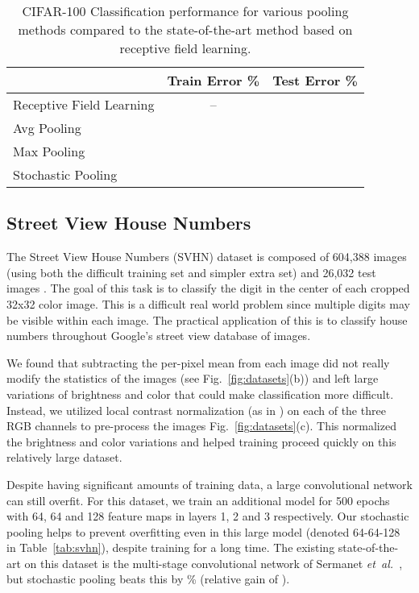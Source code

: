 \documentclass{article} \usepackage{nips12submit_e,times}
\newcommand{\fig}[1]{Fig.~\ref{fig:#1}}
\newcommand{\tab}[1]{Table~\ref{tab:#1}}
\def\etal{{\textit{et~al.~}}}
\begin{document}
\begin{table}[h!]
\small
\vspace*{-2mm}
\begin{center}
\begin{tabular}{|l|c|c|}
  \hline
  & Train Error \% & Test Error \% \\
  \hline Receptive Field Learning \cite{Jia11} & -- &  \\
  \hline  \hline   Avg Pooling &  &  \\
   \hline Max Pooling &  &  \\
   \hline Stochastic Pooling &  &  \\
   \hline
\end{tabular}
\vspace*{-1mm}
\caption{CIFAR-100 Classification performance for various pooling
  methods compared to the state-of-the-art method based on receptive
  field learning.}
\label{tab:cifar100}
\end{center}
\vspace*{-6mm}
\end{table}


\subsection{Street View House Numbers} \label{sec:SVHN}

The Street View House Numbers (SVHN) dataset is composed of 604,388
images (using both the difficult training set and simpler extra set)
and 26,032 test images \cite{SVHN}. The goal of this task is to classify the digit
in the center of each cropped 32x32 color image. This is a difficult real
world problem since multiple digits may be visible within each
image. The practical application of this is to classify house numbers
throughout Google's street view database of images.

We found that subtracting the per-pixel mean from each image did not
really modify the statistics of the images (see \fig{datasets}(b)) and
left large variations of brightness and color that could make
classification more difficult. Instead, we utilized local contrast
normalization  (as in \cite{Sermanet11}) on each of the three RGB channels to pre-process the
images \fig{datasets}(c). This normalized the brightness and color
variations and helped training proceed quickly on this relatively
large dataset.

Despite having significant amounts of training data, a large
convolutional network can still overfit. For this dataset, we train an additional model for 500
epochs with 64, 64 and 128 feature maps in layers 1, 2 and 3 respectively. Our stochastic pooling
helps to prevent overfitting even in this large model (denoted 64-64-128 in \tab{svhn}), despite
training for a long time. The existing
state-of-the-art on this dataset is the multi-stage
convolutional network of Sermanet \etal \cite{Sermanet11}, but
stochastic pooling beats this by \% (relative gain of ).
\end{document}
